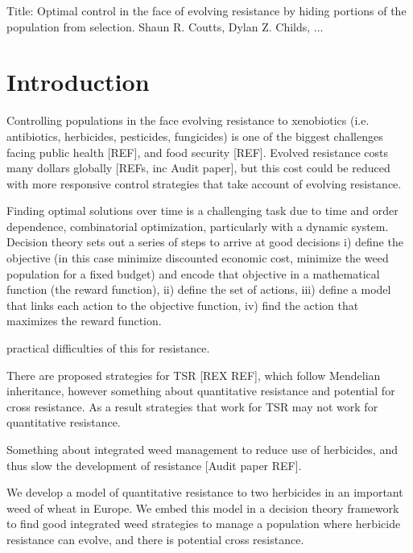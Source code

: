 \documentclass[12pt, a4paper]{article}
\begin{document}
Title: Optimal control in the face of evolving resistance by hiding portions of the population from selection.
Shaun R. Coutts, Dylan Z. Childs, ...

\section*{Introduction}
Controlling populations in the face evolving resistance to xenobiotics (i.e. antibiotics, herbicides, pesticides, fungicides) is one of the biggest challenges facing public health [REF], and food security [REF]. Evolved resistance costs many dollars globally [REFs, inc Audit paper], but this cost could be reduced with more responsive control strategies that take account of evolving resistance.

Finding optimal solutions over time is a challenging task due to time and order dependence, combinatorial optimization, particularly with a dynamic system. Decision theory sets out a series of steps to arrive at good decisions i) define the objective (in this case minimize discounted economic cost, minimize the weed population for a fixed budget) and encode that objective in a mathematical function (the reward function), ii) define the set of actions, iii) define a model that links each action to the objective function, iv) find the action that maximizes the reward function.

practical difficulties of this for resistance.           

There are proposed strategies for TSR [REX REF], which follow Mendelian inheritance, however something about quantitative resistance and potential for cross resistance. As a result strategies that work for TSR may not work for quantitative resistance.

Something about integrated weed management to reduce use of herbicides, and thus slow the development of resistance [Audit paper REF].      

We develop a model of quantitative resistance to two herbicides in an important weed of wheat in Europe. We embed this model in a decision theory framework to find good integrated weed strategies to manage a population where herbicide resistance can evolve, and there is potential cross resistance.        
\end{document}
